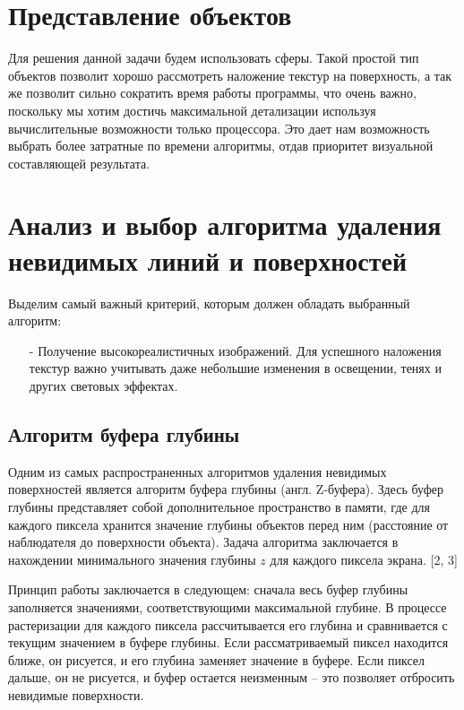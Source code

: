 \section{Представление объектов}

Для решения данной задачи будем использовать сферы. Такой простой тип объектов позволит хорошо рассмотреть наложение текстур на поверхность, а так же позволит сильно сократить время работы программы, что очень важно, поскольку мы хотим достичь максимальной детализации используя вычислительные возможности только процессора. Это дает нам возможность выбрать более затратные по времени алгоритмы, отдав приоритет визуальной составляющей результата.

\section{Анализ и выбор алгоритма удаления невидимых линий и поверхностей}

Выделим самый важный критерий, которым должен обладать выбранный алгоритм:
\begin{itemize}[label=\arabic*)]
	\item[-] Получение высокореалистичных изображений. Для успешного наложения текстур важно учитывать даже небольшие изменения в освещении, тенях и других световых эффектах.
\end{itemize}

\subsection{Алгоритм буфера глубины}

Одним из самых распространенных алгоритмов удаления невидимых поверхностей является алгоритм буфера глубины (англ. Z-буфера). Здесь буфер глубины представляет собой дополнительное пространство в памяти, где для каждого пиксела хранится значение глубины объектов перед ним (расстояние от наблюдателя до поверхности объекта). Задача алгоритма заключается в нахождении минимального значения глубины $z$ для каждого пиксела экрана. [2, 3]

Принцип работы заключается в следующем: сначала весь буфер глубины
заполняется значениями, соответствующими максимальной глубине. В процессе растеризации для каждого пиксела рассчитывается его глубина и сравнивается с текущим значением в буфере глубины. Если рассматриваемый пиксел находится ближе, он рисуется, и его глубина заменяет значение в буфере. Если пиксел дальше, он не рисуется, и буфер остается неизменным – это позволяет отбросить невидимые поверхности.

